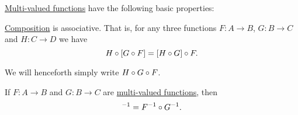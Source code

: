 \begin{proposition}\label{thm:def:multivalued_function/properties}
  \hyperref[def:multi_valued_function]{Multi-valued functions} have the following basic properties:

  \begin{thmenum}
     \hyperref[def:multi_valued_function/composition]{Composition} is associative. That is, for any three functions \( F: A \to B \), \( G: B \to C \) and \( H: C \to D \) we have
    \begin{equation*}
      H \bincirc [G \bincirc F] = [H \bincirc G] \bincirc F.
    \end{equation*}

    We will henceforth simply write \( H \bincirc G \bincirc F \).

     If \( F: A \to B \) and \( G: B \to C \) are \hyperref[def:multi_valued_function]{multi-valued functions}, then
    \begin{equation*}
      [G \bincirc F]^{-1} = F^{-1} \bincirc G^{-1}.
    \end{equation*}
  \end{thmenum}
\end{proposition}
